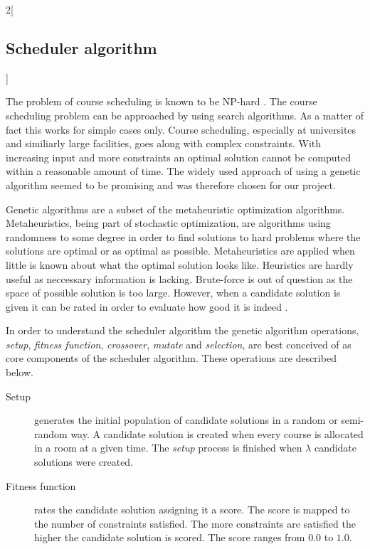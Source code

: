 \begin{multicols}{2}[\subsection{Scheduler algorithm}]

The problem of course scheduling is known to be NP-hard \cite{JSSP}. The course scheduling problem can be approached by using search algorithms. As a matter of fact this works for simple cases only. Course scheduling, especially at universites and similiarly large facilities, goes along with complex constraints. With increasing input and more constraints an optimal solution cannot be computed within a reasonable amount of time. The widely used approach of using a genetic algorithm seemed to be promising and was therefore chosen for our project.

Genetic algorithms are a subset of the metaheuristic optimization algorithms. Metaheuristics, being part of stochastic optimization, are algorithms using randomness to some degree in order to find solutions to hard problems where the solutions are optimal or as optimal as possible. Metaheuristics are applied when little is known about what the optimal solution looks like. Heuristics are hardly useful as neccessary information is lacking. Brute-force is out of question as the space of possible solution is too large. However, when a candidate solution is given it can be rated in order to evaluate how good it is indeed \cite{Luke2009Metaheuristics}.

In order to understand the scheduler algorithm the genetic algorithm operations, \emph{setup}, \emph{fitness function}, \emph{crossover}, \emph{mutate} and \emph{selection}, are best conceived of as core components of the scheduler algorithm. These operations are described below.

\begin{description}
\item[Setup] generates the initial population of candidate solutions in a random or semi-random way. A candidate solution is created when every course is allocated in a room at a given time. The \emph{setup} process is finished when $\lambda$ candidate solutions were created.

\item[Fitness function] rates the candidate solution assigning it a score. The score is mapped to the number of constraints satisfied. The more constraints are satisfied the higher the candidate solution is scored. The score ranges from $0.0$ to $1.0$.


\end{description}
\end{multicols}
